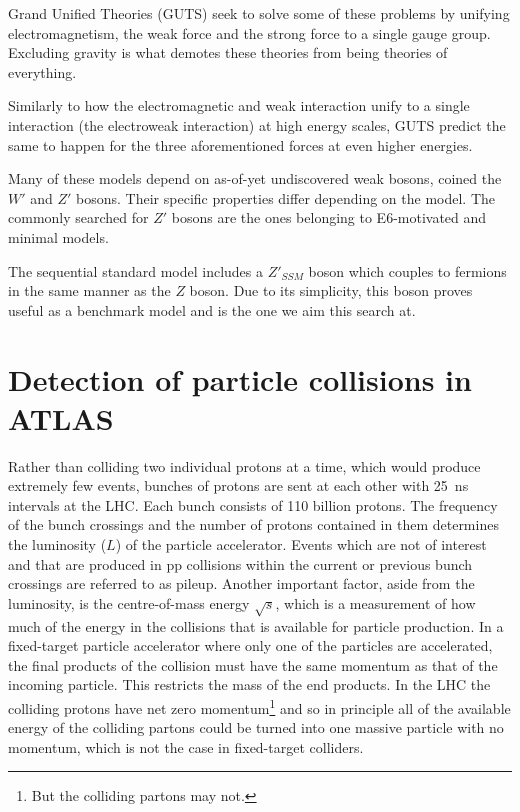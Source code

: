 \documentclass{article}
\begin{document}
\begin{titlepage}
Grand Unified Theories (GUTS) seek to solve some of these problems by unifying electromagnetism, the weak force and the strong force to a single gauge group. Excluding gravity is what demotes these theories from being theories of everything. 

Similarly to how the electromagnetic and weak interaction unify to a single interaction (the electroweak interaction) at high energy scales, GUTS predict the same to happen for the three aforementioned forces at even higher energies. 

Many of these models depend on as-of-yet undiscovered weak bosons, coined the $W'$ and $Z'$ bosons. Their specific properties differ depending on the model. The commonly searched for $Z'$ bosons are the ones belonging to E6-motivated and minimal models. 

The sequential standard model includes a $Z'_{SSM}$ boson which couples to fermions in the same manner as the $Z$ boson. Due to its simplicity, this boson proves useful as a benchmark model and is the one we aim this search at.



\section{Detection of particle collisions in ATLAS}

Rather than colliding two individual protons at a time, which would produce extremely few events, bunches of protons are sent at each other with \SI{25}{\nano \second} intervals at the LHC. Each bunch consists of 110 billion protons. The frequency of the bunch crossings and the number of protons contained in them determines the luminosity ($L$) of the particle accelerator. Events which are not of interest and that are produced in pp collisions within the current or previous bunch crossings are referred to as pileup. Another important factor, aside from the luminosity, is the centre-of-mass energy $\sqrt{s}$, which is a measurement of how much of the energy in the collisions that is available for particle production. In a fixed-target particle accelerator where only one of the particles are accelerated, the final products of the collision must have the same momentum as that of the incoming particle. This restricts the mass of the end products. In the LHC the colliding protons have net zero momentum\footnote{But the colliding partons may not.} and so in principle all of the available energy of the colliding partons could be turned into one massive particle with no momentum, which is not the case in fixed-target colliders.



\end{titlepage}
\end{document}
